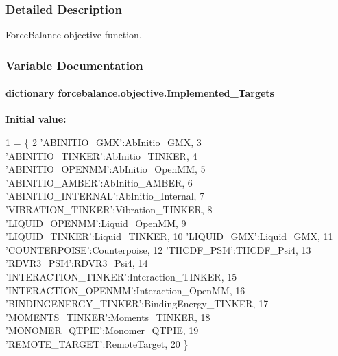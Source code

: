 \subsubsection{Detailed Description}
Force\-Balance objective function. 

\subsubsection{Variable Documentation}
\hypertarget{namespaceforcebalance_1_1objective_a8c93e21f995ed17addb493ec94368ab5}{
\paragraph[{Implemented\-\_\-\-Targets}]{\setlength{\rightskip}{0pt plus 5cm}dictionary forcebalance.\-objective.\-Implemented\-\_\-\-Targets}}\label{namespaceforcebalance_1_1objective_a8c93e21f995ed17addb493ec94368ab5}
{\bfseries Initial value\-:}
\begin{DoxyCode}
1 = \{
2     \textcolor{stringliteral}{'ABINITIO\_GMX'}:AbInitio\_GMX,
3     \textcolor{stringliteral}{'ABINITIO\_TINKER'}:AbInitio\_TINKER,
4     \textcolor{stringliteral}{'ABINITIO\_OPENMM'}:AbInitio\_OpenMM,
5     \textcolor{stringliteral}{'ABINITIO\_AMBER'}:AbInitio\_AMBER,
6     \textcolor{stringliteral}{'ABINITIO\_INTERNAL'}:AbInitio\_Internal,
7     \textcolor{stringliteral}{'VIBRATION\_TINKER'}:Vibration\_TINKER,
8     \textcolor{stringliteral}{'LIQUID\_OPENMM'}:Liquid\_OpenMM,
9     \textcolor{stringliteral}{'LIQUID\_TINKER'}:Liquid\_TINKER, 
10     \textcolor{stringliteral}{'LIQUID\_GMX'}:Liquid\_GMX, 
11     \textcolor{stringliteral}{'COUNTERPOISE'}:Counterpoise,
12     \textcolor{stringliteral}{'THCDF\_PSI4'}:THCDF\_Psi4,
13     \textcolor{stringliteral}{'RDVR3\_PSI4'}:RDVR3\_Psi4,
14     \textcolor{stringliteral}{'INTERACTION\_TINKER'}:Interaction\_TINKER,
15     \textcolor{stringliteral}{'INTERACTION\_OPENMM'}:Interaction\_OpenMM,
16     \textcolor{stringliteral}{'BINDINGENERGY\_TINKER'}:BindingEnergy\_TINKER,
17     \textcolor{stringliteral}{'MOMENTS\_TINKER'}:Moments\_TINKER,
18     \textcolor{stringliteral}{'MONOMER\_QTPIE'}:Monomer\_QTPIE,
19     \textcolor{stringliteral}{'REMOTE\_TARGET'}:RemoteTarget,
20     \}
\end{DoxyCode}


